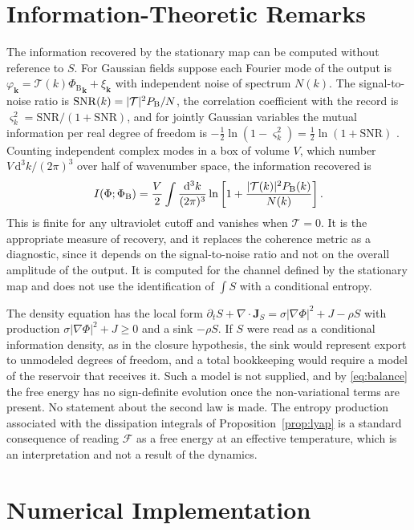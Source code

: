 \documentclass[11pt]{article}
\theoremstyle{definition}
\theoremstyle{remark}
\newcommand{\dd}{\mathrm{d}}
\newcommand{\Phib}{{\Phi_{\mathrm{B}}}}
\newcommand{\TT}{\mathcal{T}}
\newcommand{\FF}{\mathcal{F}}
\begin{document}
\section{Information-Theoretic Remarks}

The information recovered by the stationary map can be computed without reference to $S$. For Gaussian fields suppose each Fourier mode of the output is $\varphi_{\mathbf k}=\TT(k)\Phib_{\mathbf k}+\xi_{\mathbf k}$ with independent noise of spectrum $N(k)$. The signal-to-noise ratio is $\mathrm{SNR}(k)=|\TT|^2P_{\rm B}/N$, the correlation coefficient with the record is $\varsigma_k^2=\mathrm{SNR}/(1+\mathrm{SNR})$, and for jointly Gaussian variables the mutual information per real degree of freedom is $-\tfrac12\ln(1-\varsigma_k^2)=\tfrac12\ln(1+\mathrm{SNR})$ \cite{cover2006}. Counting independent complex modes in a box of volume $V$, which number $V\,\dd^3k/(2\pi)^3$ over half of wavenumber space, the information recovered is
\begin{equation}
I(\Phi;\Phib)=\frac V2\int\frac{\dd^3k}{(2\pi)^3}\ln\left[1+\frac{|\TT(k)|^2P_{\rm B}(k)}{N(k)}\right].
\end{equation}
This is finite for any ultraviolet cutoff and vanishes when $\TT=0$. It is the appropriate measure of recovery, and it replaces the coherence metric as a diagnostic, since it depends on the signal-to-noise ratio and not on the overall amplitude of the output. It is computed for the channel defined by the stationary map and does not use the identification of $\int S$ with a conditional entropy.

The density equation has the local form $\partial_tS+\nabla\!\cdot\!\mathbf J_S=\sigma|\nabla\Phi|^2+J-\rho S$ with production $\sigma|\nabla\Phi|^2+J\ge0$ and a sink $-\rho S$. If $S$ were read as a conditional information density, as in the closure hypothesis, the sink would represent export to unmodeled degrees of freedom, and a total bookkeeping would require a model of the reservoir that receives it. Such a model is not supplied, and by \eqref{eq:balance} the free energy has no sign-definite evolution once the non-variational terms are present. No statement about the second law is made. The entropy production associated with the dissipation integrals of Proposition~\ref{prop:lyap} is a standard consequence of reading $\FF$ as a free energy at an effective temperature, which is an interpretation and not a result of the dynamics.

\section{Numerical Implementation}
\end{document}
